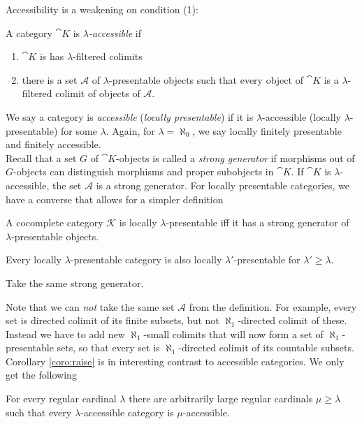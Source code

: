 Accessibility is a weakening on condition (1):

\begin{Definition}
A category $\cat K$ is \emph{$\lambda$-accessible} if
\begin{enumerate}
\item $\cat K$ is has $\lambda$-filtered colimits
\item there is a set $\mathcal A$ of $\lambda$-presentable objects such that every object of $\cat K$ is a $\lambda$-filtered colimit of objects of $\mathcal A$.
\end{enumerate}
\end{Definition}

We say a category is \emph{accessible} (\emph{locally presentable}) if it is $\lambda$-accessible (locally $\lambda$-presentable) for some $\lambda$. Again, for $\lambda = \aleph_0$, we say locally finitely presentable and finitely accessible. \\

Recall that a set $G$ of $\cat K$-objects is called a \emph{strong generator} if morphisms out of $G$-objects can distinguish morphisms and proper subobjects in $\cat K$. If $\cat K$ is $\lambda$-accessible, the set $\mathcal A$ is a strong generator. For locally presentable categories, we have a converse that allows for a simpler definition
\begin{Proposition}
A cocomplete category $\mathcal K$ is locally $\lambda$-presentable iff it has a strong generator of $\lambda$-presentable objects. 
\end{Proposition}

\begin{Corollary}\label{coro:raise}
Every locally $\lambda$-presentable category is also locally $\lambda'$-presentable for $\lambda' \geq \lambda$.
\end{Corollary}
\begin{Proof}
Take the same strong generator.
\end{Proof}

Note that we can \emph{not} take the same set $\mathcal A$ from the definition. For example, every set is directed colimit of its finite subsets, but not $\aleph_1$-directed colimit of these. Instead we have to add new $\aleph_1$-small colimits that will now form a set of $\aleph_1$-presentable sets, so that every set is $\aleph_1$-directed colimit of its countable subsets. \\

Corollary \ref{coro:raise} is in interesting contrast to accessible categories. We only get the following
\begin{Proposition}
For every regular cardinal $\lambda$ there are arbitrarily large regular cardinals $\mu \geq \lambda$ such that every $\lambda$-accessible category is $\mu$-accessible.
\end{Proposition}

